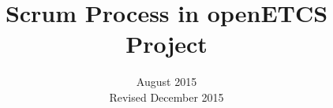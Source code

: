 \documentclass{template/openetcs_report}
\usepackage{lipsum,url}
\usepackage{supertabular}
\usepackage{multirow}
\usepackage{color, colortbl}
\usepackage{float}
\usepackage[modulo]{lineno}
\graphicspath{{./template/}{.}{./images/}}




\usepackage[textwidth=2.7cm,textsize=scriptsize,linecolor=green!40,backgroundcolor=green!40]{todonotes}

\newcommand{\mycomment}[2][]
{
\refstepcounter{mycommentcounter}%
\todo[color={red!100!green!33}]{
\textbf{[\uppercase{#1} \themycommentcounter]:} #2}
}
\setlength{\marginparwidth}{2.5cm}



\frontmatter
{}





\title{Scrum Process in openETCS Project}

\subtitle{}

\date{August 2015 \\ Revised December 2015}


